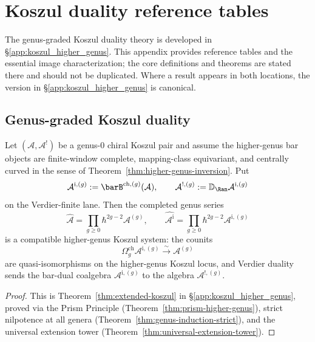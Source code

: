 \chapter{Koszul duality reference tables}
\label{app:koszul-reference}


\begin{remark}
The genus-graded Koszul duality theory is developed in
\S\ref{app:koszul_higher_genus}. This appendix provides reference
tables and the essential image characterization; the core definitions
and theorems are stated there and should not be duplicated. Where a
result appears in both locations, the version in
\S\ref{app:koszul_higher_genus} is canonical.
\end{remark}

\section{Genus-graded Koszul duality}

\begin{theorem}
\label{thm:extended-koszul-appendix}
Let $(\mathcal{A},\mathcal{A}^{!})$ be a genus-$0$ chiral Koszul
pair and assume the higher-genus bar objects are finite-window
complete, mapping-class equivariant, and centrally curved in the
sense of Theorem~\ref{thm:higher-genus-inversion}. Put
\[
\mathcal{A}^{\mathrm i,(g)}:=\barB^{\mathrm{ch},(g)}(\mathcal{A}),
\qquad
\mathcal{A}^{!,(g)}:=
\mathbb{D}_{\Ran}\mathcal{A}^{\mathrm i,(g)}
\]
on the Verdier-finite lane. Then the completed genus series
\[
\widehat{\mathcal{A}}=\prod_{g\geq 0}\hbar^{2g-2}\mathcal{A}^{(g)},
\qquad
\widehat{\mathcal{A}^{\mathrm i}}
=\prod_{g\geq 0}\hbar^{2g-2}\mathcal{A}^{\mathrm i,(g)}
\]
is a compatible higher-genus Koszul system: the counits
\[
\Omega^{\mathrm{ch}}_g
\mathcal{A}^{\mathrm i,(g)}
\xrightarrow{\;\sim\;}
\mathcal{A}^{(g)}
\]
are quasi-isomorphisms on the higher-genus Koszul locus, and
Verdier duality sends the bar-dual coalgebra
$\mathcal{A}^{\mathrm i,(g)}$ to the algebra
$\mathcal{A}^{!,(g)}$.
\end{theorem}

\begin{proof}
This is Theorem~\ref{thm:extended-koszul} in
\S\ref{app:koszul_higher_genus}, proved via the Prism Principle
(Theorem~\ref{thm:prism-higher-genus}), strict nilpotence at all genera
(Theorem~\ref{thm:genus-induction-strict}), and the universal extension tower
(Theorem~\ref{thm:universal-extension-tower}).
\end{proof}

